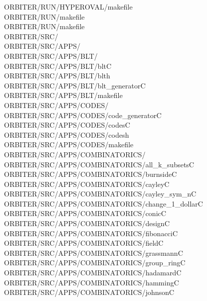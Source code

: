\begin{tabbing}
ORBITER/RUN/HYPEROVAL/makefile\\[0pt]
ORBITER/RUN/makefile\\[0pt]
ORBITER/RUN/makefile\\[0pt]
ORBITER/SRC/\\[0pt]
ORBITER/SRC/APPS/\\[0pt]
ORBITER/SRC/APPS/BLT/\\[0pt]
ORBITER/SRC/APPS/BLT/bltC\\[0pt]
ORBITER/SRC/APPS/BLT/blth\\[0pt]
ORBITER/SRC/APPS/BLT/blt\_generatorC\\[0pt]
ORBITER/SRC/APPS/BLT/makefile\\[0pt]
ORBITER/SRC/APPS/CODES/\\[0pt]
ORBITER/SRC/APPS/CODES/code\_generatorC\\[0pt]
ORBITER/SRC/APPS/CODES/codesC\\[0pt]
ORBITER/SRC/APPS/CODES/codesh\\[0pt]
ORBITER/SRC/APPS/CODES/makefile\\[0pt]
ORBITER/SRC/APPS/COMBINATORICS/\\[0pt]
ORBITER/SRC/APPS/COMBINATORICS/all\_k\_subsetsC\\[0pt]
ORBITER/SRC/APPS/COMBINATORICS/burnsideC\\[0pt]
ORBITER/SRC/APPS/COMBINATORICS/cayleyC\\[0pt]
ORBITER/SRC/APPS/COMBINATORICS/cayley\_sym\_nC\\[0pt]
ORBITER/SRC/APPS/COMBINATORICS/change\_1\_dollarC\\[0pt]
ORBITER/SRC/APPS/COMBINATORICS/conicC\\[0pt]
ORBITER/SRC/APPS/COMBINATORICS/designC\\[0pt]
ORBITER/SRC/APPS/COMBINATORICS/fibonacciC\\[0pt]
ORBITER/SRC/APPS/COMBINATORICS/fieldC\\[0pt]
ORBITER/SRC/APPS/COMBINATORICS/grassmannC\\[0pt]
ORBITER/SRC/APPS/COMBINATORICS/group\_ringC\\[0pt]
ORBITER/SRC/APPS/COMBINATORICS/hadamardC\\[0pt]
ORBITER/SRC/APPS/COMBINATORICS/hammingC\\[0pt]
ORBITER/SRC/APPS/COMBINATORICS/johnsonC\\[0pt]

\end{tabbing}
